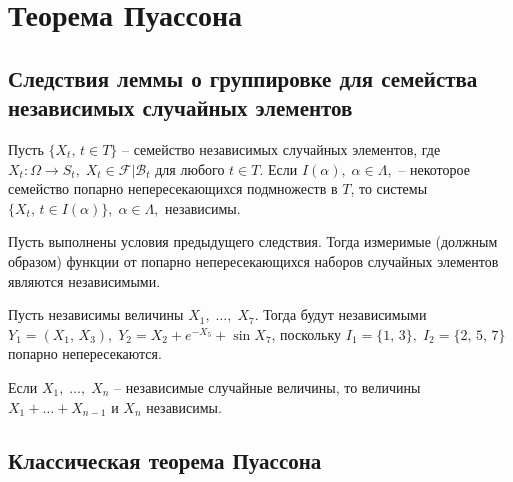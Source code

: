 \section{Теорема Пуассона}

\subsection{Следствия леммы о группировке для семейства независимых случайных элементов}

\begin{col}\label{lect06:col1}
Пусть $\{X_t,\,t\in T\}$ -- семейство независимых случайных элементов, где $X_t\colon\Omega\to S_t,\;X_t\in\mathcal{F}|\mathcal{B}_t$ для любого $t\in T$. Если $I(\alpha),\;\alpha\in\Lambda,$ -- некоторое семейство попарно непересекающихся подмножеств в $T$, то системы $\{X_t,\,t\in I(\alpha)\},\;\alpha\in\Lambda,$ независимы.
\end{col}

\begin{col}\label{lect06:col2}
Пусть выполнены условия предыдущего следствия. Тогда измеримые (должным образом) функции от попарно непересекающихся наборов случайных элементов являются независимыми.
\end{col}

\begin{example}\label{lect06:ex2}
Пусть независимы величины $X_1,\;\ldots,\;X_7$. Тогда будут независимыми $Y_1=(X_1,\,X_3),\;Y_2=X_2+e^{-X_5}+\sin{X_7}$, поскольку $I_1=\{1,\,3\},\; I_2=\{2,\,5,\,7\}$ попарно непересекаются. 
\end{example}

\begin{nb}\label{lect06:nb1}
Если $X_1,\;\ldots,\;X_n$ -- независимые случайные величины, то величины $X_1+\ldots+X_{n-1}$ и $X_n$ независимы.
\end{nb}

\subsection{Классическая теорема Пуассона}


